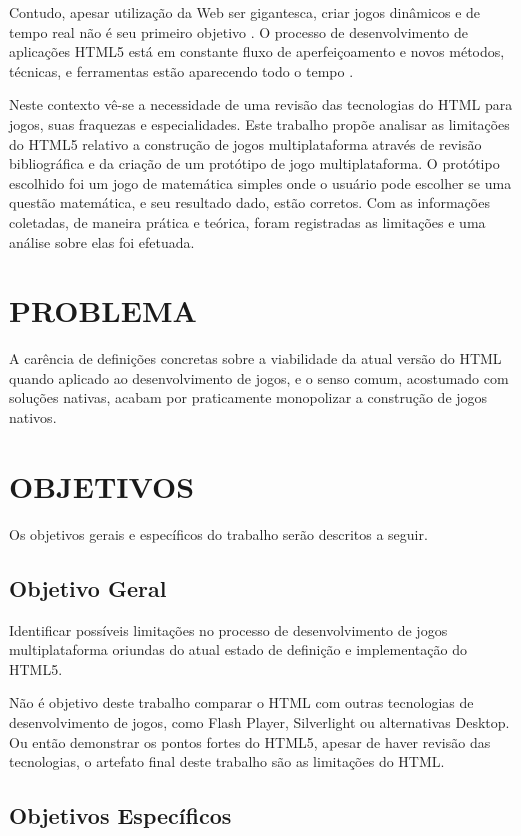 Contudo, apesar utilização da Web ser gigantesca, criar
jogos dinâmicos e de tempo real não é seu primeiro objetivo
\autocite{html5mostwanted}. O processo de desenvolvimento de
aplicações HTML5 está em constante fluxo de aperfeiçoamento e novos
métodos, técnicas, e ferramentas estão aparecendo todo o tempo
\autocite{crossPlatformMobileGame}.

Neste contexto vê-se a necessidade de uma revisão das tecnologias do
HTML para jogos, suas fraquezas e especialidades. Este trabalho propõe
analisar as limitações do HTML5 relativo a construção de jogos
multiplataforma através de revisão bibliográfica e da criação de um
protótipo de jogo multiplataforma. O protótipo escolhido foi um jogo
de matemática simples onde o usuário pode escolher se uma questão
matemática, e seu resultado dado, estão corretos. Com as informações
coletadas, de maneira prática e teórica, foram registradas as limitações
e uma análise sobre elas foi efetuada.

\section{PROBLEMA}
A carência de definições concretas sobre a viabilidade da atual
versão do HTML quando aplicado ao desenvolvimento de jogos, e o senso
comum, acostumado com soluções nativas, acabam por praticamente
monopolizar a construção de jogos nativos.
\section{OBJETIVOS}

Os objetivos gerais e específicos do trabalho serão descritos a seguir.

\subsection{Objetivo Geral}

Identificar possíveis limitações no processo de desenvolvimento
de jogos multiplataforma oriundas do atual estado de definição e
implementação do HTML5.

Não é objetivo deste trabalho comparar o HTML com outras tecnologias
de desenvolvimento de jogos, como Flash Player, Silverlight ou
alternativas Desktop. Ou então demonstrar os pontos fortes do HTML5,
apesar de haver revisão das tecnologias, o artefato final deste
trabalho são as limitações do HTML.

\subsection{Objetivos Específicos}

